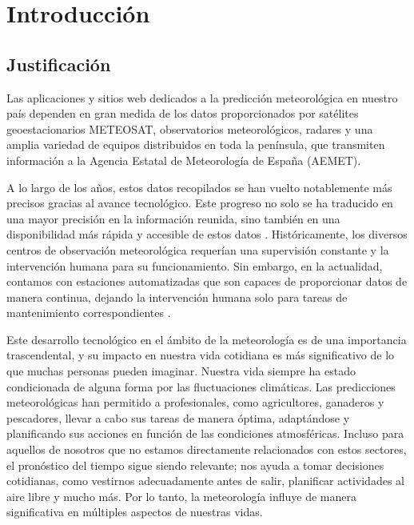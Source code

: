 \chapter{Introducción}



\section{Justificación}
Las aplicaciones y sitios web dedicados a la predicción meteorológica en nuestro país dependen en gran medida de los datos proporcionados por satélites geoestacionarios METEOSAT, observatorios meteorológicos, radares y una amplia variedad de equipos distribuidos en toda la península, que transmiten información a la Agencia Estatal de Meteorología de España (AEMET).

A lo largo de los años, estos datos recopilados se han vuelto notablemente más precisos gracias al avance tecnológico. Este progreso no solo se ha traducido en una mayor precisión en la información reunida, sino también en una disponibilidad más rápida y accesible de estos datos \cite{intro_1}. Históricamente, los diversos centros de observación meteorológica requerían una supervisión constante y la intervención humana para su funcionamiento. Sin embargo, en la actualidad, contamos con estaciones automatizadas que son capaces de proporcionar datos de manera continua, dejando la intervención humana solo para tareas de mantenimiento correspondientes \cite{intro_2}.

Este desarrollo tecnológico en el ámbito de la meteorología es de una importancia trascendental, y su impacto en nuestra vida cotidiana es más significativo de lo que muchas personas pueden imaginar. Nuestra vida siempre ha estado condicionada de alguna forma por las fluctuaciones climáticas. Las predicciones meteorológicas han permitido a profesionales, como agricultores, ganaderos y pescadores, llevar a cabo sus tareas de manera óptima, adaptándose y planificando sus acciones en función de las condiciones atmosféricas. Incluso para aquellos de nosotros que no estamos directamente relacionados con estos sectores, el pronóstico del tiempo sigue siendo relevante; nos ayuda a tomar decisiones cotidianas, como vestirnos adecuadamente antes de salir, planificar actividades al aire libre y mucho más. Por lo tanto, la meteorología influye de manera significativa en múltiples aspectos de nuestras vidas.

